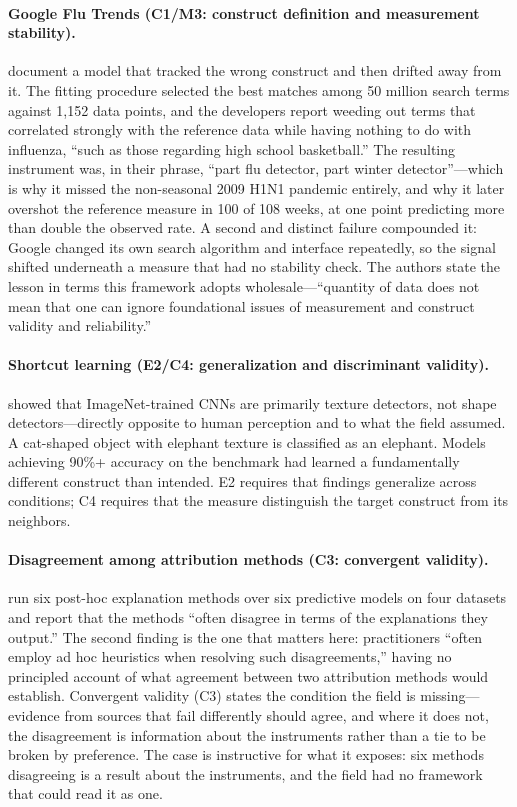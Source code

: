 \documentclass{article}
\begin{document}
\paragraph{Google Flu Trends (C1/M3: construct definition and measurement stability).}
\citet{lazer2014parable} document a model that tracked the wrong construct and then drifted away from it. The fitting procedure selected the best matches among 50 million search terms against 1{,}152 data points, and the developers report weeding out terms that correlated strongly with the reference data while having nothing to do with influenza, ``such as those regarding high school basketball.'' The resulting instrument was, in their phrase, ``part flu detector, part winter detector''---which is why it missed the non-seasonal 2009 H1N1 pandemic entirely, and why it later overshot the reference measure in 100 of 108 weeks, at one point predicting more than double the observed rate. A second and distinct failure compounded it: Google changed its own search algorithm and interface repeatedly, so the signal shifted underneath a measure that had no stability check. The authors state the lesson in terms this framework adopts wholesale---``quantity of data does not mean that one can ignore foundational issues of measurement and construct validity and reliability.''

\paragraph{Shortcut learning (E2/C4: generalization and discriminant validity).}
\citet{geirhos2019imagenet} showed that ImageNet-trained CNNs are primarily texture detectors, not shape detectors---directly opposite to human perception and to what the field assumed. A cat-shaped object with elephant texture is classified as an elephant. Models achieving 90\%+ accuracy on the benchmark had learned a fundamentally different construct than intended. E2 requires that findings generalize across conditions; C4 requires that the measure distinguish the target construct from its neighbors.


\paragraph{Disagreement among attribution methods (C3: convergent validity).}
\citet{krishna2022disagreement} run six post-hoc explanation methods over six predictive models on four datasets and report that the methods ``often disagree in terms of the explanations they output.'' The second finding is the one that matters here: practitioners ``often employ ad hoc heuristics when resolving such disagreements,'' having no principled account of what agreement between two attribution methods would establish. Convergent validity (C3) states the condition the field is missing---evidence from sources that fail differently should agree, and where it does not, the disagreement is information about the instruments rather than a tie to be broken by preference. The case is instructive for what it exposes: six methods disagreeing is a result about the instruments, and the field had no framework that could read it as one.
\end{document}
